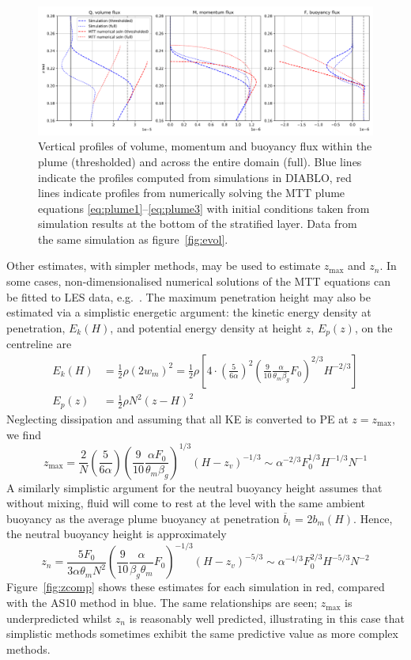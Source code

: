 \documentclass[a4paper]{article}
\begin{document}
\begin{figure}
	\centering
	\includegraphics[width=\textwidth]{fluxes}
	\caption{Vertical profiles of volume, momentum and buoyancy flux within the plume (thresholded) and across
		the entire domain (full). Blue lines indicate the profiles computed from simulations in DIABLO, red
		lines indicate profiles from numerically solving the MTT plume equations
		\eqref{eq:plume1}--\eqref{eq:plume3} with initial conditions taken from simulation results at the
		bottom of the stratified layer. Data from the same simulation as figure~\ref{fig:evol}.}
	\label{fig:fluxes}
\end{figure}

Other estimates, with simpler methods, may be used to estimate $z_{\max}$ and $z_n$. In some cases,
non-dimensionalised numerical solutions of the MTT equations can be fitted to LES data, e.g.\
\citet{devenish2010}. The maximum penetration height may also be estimated via a simplistic energetic
argument: the kinetic energy density at penetration, $E_k(H)$, and potential energy density at height $z$,
$E_p(z)$, on the centreline are
\begin{align}
	E_k(H) &= \frac{1}{2}\rho (2 w_m)^2 = \frac{1}{2}\rho \left[4 \cdot \left(\frac{5}{6\alpha}\right)^2
		\left(\frac{9}{10} \frac{\alpha}{\theta_m \beta_g} F_0\right)^{2/3} H^{-2/3}\right]\\
	E_p(z) &= \frac{1}{2}\rho N^2 (z-H)^2
\end{align}
Neglecting dissipation and assuming that all KE is converted to PE at $z=z_{\max}$, we find
\begin{equation}
	z_{\max} = \frac{2}{N} \left(\frac{5}{6\alpha}\right)\left(\frac{9}{10}\frac{\alpha F_0}{\theta_m \beta_g}
		\right)^{1/3} \left(H-z_v\right)^{-1/3} \sim \alpha^{-2/3} F_0^{1/3} H^{-1/3} N^{-1} 
\end{equation}
A similarly simplistic argument for the neutral buoyancy height assumes that without mixing, fluid will come to
rest at the level with the same ambient buoyancy as the average plume buoyancy at penetration
$\overline{b}_i$ = 2$b_m(H)$. Hence, the neutral buoyancy height is approximately
\begin{equation}
	z_n = \frac{5F_0}{3\alpha \theta_m N^2} \left(\frac{9}{10}\frac{\alpha}{\beta_g \theta_m}
	F_0\right)^{-1/3} \left(H-z_v\right)^{-5/3} \sim \alpha^{-4/3} F_0^{2/3} H^{-5/3} N^{-2}
\end{equation}
Figure~\ref{fig:zcomp} shows these estimates for each simulation in red, compared with the AS10 method in
blue. The same relationships are seen; $z_{\max}$ is underpredicted whilst $z_n$ is reasonably well predicted,
illustrating in this case that simplistic methods sometimes exhibit the same predictive value as more complex
methods.
\end{document}

